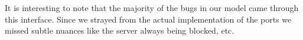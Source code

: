 
It is interesting to note that the majority of the bugs in our model
came through this interface.  Since we strayed from the actual
implementation of the ports we missed subtle nuances like the server
always being blocked, etc. 

